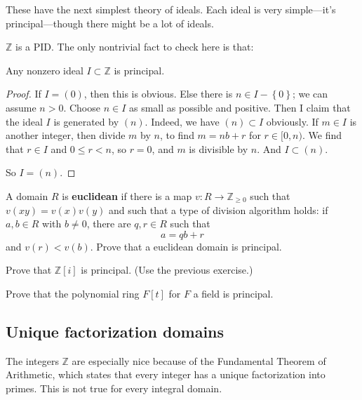 These have the next simplest theory of ideals.
Each ideal is very simple---it's principal---though there might be a lot of ideals.

\begin{example} 
$\mathbb{Z}$ is a PID. The only nontrivial fact to check here is that:
\begin{proposition} 
Any nonzero ideal $I \subset \mathbb{Z}$ is principal.
\end{proposition} 
\begin{proof} 
If $I = (0)$, then this is obvious.  Else there is $n \in I -
\left\{0\right\}$; we can assume $n>0$.  Choose $n \in I$ as small as possible and
positive. Then  I claim that the ideal $I$ is generated by $(n)$. Indeed, we have $(n)
\subset I$ obviously. If $m \in I$ is another integer, then divide $m$ by $n$,
to find $m = nb + r$ for $r \in [0, n)$. We find that $r \in I$ and $0 \leq r <
n$, so $r=0$, and $m$ is divisible by $n$. And $I \subset (n)$. 

So $I = (n)$.
\end{proof} 
\end{example} 


\begin{exercise} 
A domain $R$ is \textbf{euclidean} if there is a map $v: R \to
\mathbb{Z}_{\geq 0}$
such that $v(xy) = v(x)v(y)$ and such that a type of division algorithm
holds: if $a,b \in R$ with $b \neq 0$, there are $q,r \in R$ such that
\[ a = qb + r  \]
and $v(r)< v(b)$. Prove that a euclidean domain is principal.
\end{exercise} 

\begin{exercise} \label{gaussianintegersareprincipal}
Prove that $\mathbb{Z}[i]$ is principal. (Use the previous exercise.)
\end{exercise} 

\begin{exercise} \label{polyringisprincipal}
Prove that the polynomial ring $F[t]$ for $F$ a field is principal. 
\end{exercise} 

\subsection{Unique factorization domains}

The integers $\mathbb{Z}$ are especially nice because of the Fundamental
Theorem of Arithmetic, which states that every integer has a unique
factorization into primes. This is not true for every integral domain.


